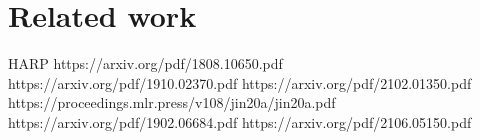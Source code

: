 \section{Related work}

HARP
https://arxiv.org/pdf/1808.10650.pdf
https://arxiv.org/pdf/1910.02370.pdf
https://arxiv.org/pdf/2102.01350.pdf
https://proceedings.mlr.press/v108/jin20a/jin20a.pdf
https://arxiv.org/pdf/1902.06684.pdf
https://arxiv.org/pdf/2106.05150.pdf
